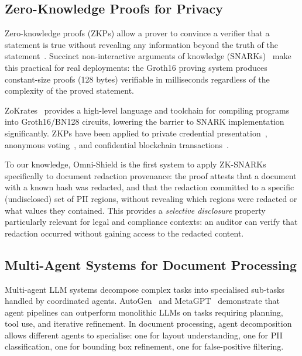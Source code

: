 \subsection{Zero-Knowledge Proofs for Privacy}

Zero-knowledge proofs (ZKPs) allow a prover to
convince a verifier that a statement is true without
revealing any information beyond the truth of the
statement~\cite{goldwasser1989knowledge}.
Succinct non-interactive arguments of knowledge
(SNARKs)~\cite{groth2016size} make this practical for
real deployments: the Groth16 proving system produces
constant-size proofs (128 bytes) verifiable in
milliseconds regardless of the complexity of the
proved statement.

ZoKrates~\cite{eberhardt2018zokrates} provides a
high-level language and toolchain for compiling
programs into Groth16/BN128 circuits, lowering the
barrier to SNARK implementation significantly.
ZKPs have been applied to private credential
presentation~\cite{camenisch1997efficient},
anonymous voting~\cite{cortier2019belenios},
and confidential blockchain
transactions~\cite{sasson2014zerocash}.

To our knowledge, Omni-Shield is the first system to
apply ZK-SNARKs specifically to document redaction
provenance: the proof attests that a document with
a known hash was redacted, and that the redaction
committed to a specific (undisclosed) set of PII
regions, without revealing which regions were redacted
or what values they contained.
This provides a \emph{selective disclosure} property
particularly relevant for legal and compliance contexts:
an auditor can verify that redaction occurred without
gaining access to the redacted content.

\subsection{Multi-Agent Systems for Document Processing}

Multi-agent LLM systems decompose complex tasks into
specialised sub-tasks handled by coordinated agents.
AutoGen~\cite{wu2023autogen} and
MetaGPT~\cite{hong2023metagpt} demonstrate that
agent pipelines can outperform monolithic LLMs on
tasks requiring planning, tool use, and iterative
refinement.
In document processing, agent decomposition allows
different agents to specialise: one for layout
understanding, one for PII classification, one for
bounding box refinement, one for false-positive
filtering.

